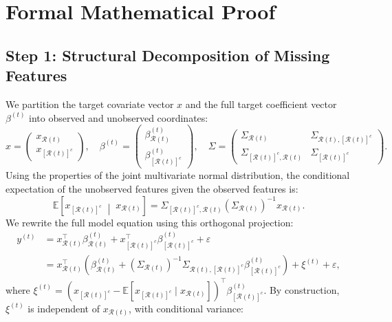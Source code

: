 \documentclass{article}
\begin{document}
\section{Formal Mathematical Proof}

\subsection{Step 1: Structural Decomposition of Missing Features}
We partition the target covariate vector $x$ and the full target coefficient vector $\beta^{(t)}$ into observed and unobserved coordinates:
\begin{equation}
x = \begin{pmatrix} x_{\mathcal{R}(t)} \\ x_{[\mathcal{R}(t)]^c} \end{pmatrix}, \quad \beta^{(t)} = \begin{pmatrix} \beta^{(t)}_{\mathcal{R}(t)} \\ \beta^{(t)}_{[\mathcal{R}(t)]^c} \end{pmatrix}, \quad \Sigma = \begin{pmatrix} \Sigma_{\mathcal{R}(t)} & \Sigma_{\mathcal{R}(t), [\mathcal{R}(t)]^c} \\ \Sigma_{[\mathcal{R}(t)]^c, \mathcal{R}(t)} & \Sigma_{[\mathcal{R}(t)]^c} \end{pmatrix}.
\end{equation}
Using the properties of the joint multivariate normal distribution, the conditional expectation of the unobserved features given the observed features is:
\begin{equation}
\mathbb{E}\left[ x_{[\mathcal{R}(t)]^c} \;\middle|\; x_{\mathcal{R}(t)} \right] = \Sigma_{[\mathcal{R}(t)]^c, \mathcal{R}(t)} \left(\Sigma_{\mathcal{R}(t)}\right)^{-1} x_{\mathcal{R}(t)}.
\end{equation}
We rewrite the full model equation using this orthogonal projection:
\begin{align}
y^{(t)} &= x_{\mathcal{R}(t)}^\top \beta^{(t)}_{\mathcal{R}(t)} + x_{[\mathcal{R}(t)]^c}^\top \beta^{(t)}_{[\mathcal{R}(t)]^c} + \varepsilon \nonumber \\
&= x_{\mathcal{R}(t)}^\top \left( \beta^{(t)}_{\mathcal{R}(t)} + \left(\Sigma_{\mathcal{R}(t)}\right)^{-1} \Sigma_{\mathcal{R}(t), [\mathcal{R}(t)]^c} \beta^{(t)}_{[\mathcal{R}(t)]^c} \right) + \xi^{(t)} + \varepsilon,
\end{align}
where $\xi^{(t)} = \left( x_{[\mathcal{R}(t)]^c} - \mathbb{E}[x_{[\mathcal{R}(t)]^c} \mid x_{\mathcal{R}(t)}] \right)^\top \beta^{(t)}_{[\mathcal{R}(t)]^c}$. By construction, $\xi^{(t)}$ is independent of $x_{\mathcal{R}(t)}$, with conditional variance:
\end{document}

